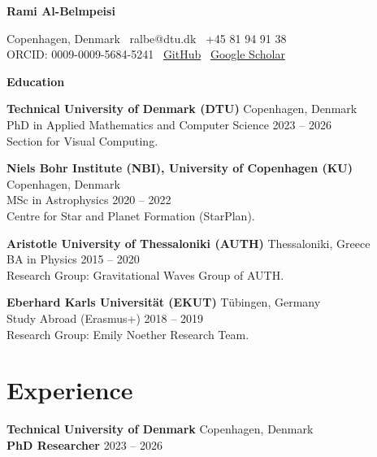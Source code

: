 \documentclass[11pt]{article}
\begin{document}
\begin{center}
    \textbf{\Large Rami Al-Belmpeisi}\\ 
    \hrulefill
\end{center}
\begin{center}
    Copenhagen, Denmark \textbullet \ ralbe@dtu.dk \textbullet \ +45 81 94 91 38 \\
    ORCID: 0009-0009-5684-5241 \textbullet \ \href{https://github.com/RamiAlBel}{GitHub} \textbullet \ \href{https://scholar.google.com/citations?user=gXBdz6wAAAAJ&hl=el&oi=ao}{Google Scholar}
\end{center}

\vspace{0.5pt}
\begin{center}
    \textbf{Education}
\end{center}
\textbf{Technical University of Denmark (DTU)} \hfill Copenhagen, Denmark \\
PhD in Applied Mathematics and Computer Science \hfill 2023 -- 2026 \\
Section for Visual Computing.

\vspace{8pt}
\textbf{Niels Bohr Institute (NBI), University of Copenhagen (KU)} \hfill Copenhagen, Denmark \\
MSc in Astrophysics \hfill 2020 -- 2022 \\
Centre for Star and Planet Formation (StarPlan).

\vspace{8pt}
\textbf{Aristotle University of Thessaloniki (AUTH)} \hfill Thessaloniki, Greece \\
BA in Physics \hfill 2015 -- 2020 \\
Research Group: Gravitational Waves Group of AUTH.

\vspace{8pt}
\textbf{Eberhard Karls Universit\"at (EKUT)} \hfill T\"ubingen, Germany \\
Study Abroad (Erasmus+) \hfill 2018 -- 2019 \\
Research Group: Emily Noether Research Team.
\section*{Experience}
\noindent
\textbf{Technical University of Denmark} \hfill Copenhagen, Denmark \\
\textbf{PhD Researcher} \hfill 2023 -- 2026
\end{document}
